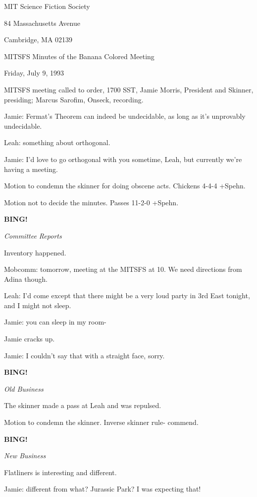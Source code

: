 \documentclass[12pt]{article}
\newcommand{\bing}{{\bf BING!} }
\newcommand{\goto}[1]{\bing \vskip 12pt \centerline{{\em{#1}}}}
\begin{document}
\begin{center}

MIT Science Fiction Society 

84 Massachusetts Avenue

Cambridge, MA 02139

\vspace{12pt}

MITSFS Minutes of the Banana Colored Meeting 

Friday, July 9, 1993

\end{center}
 
\vspace{18pt}

\setlength{\parskip}{6pt}

\noindent
MITSFS meeting called to order, 1700 SST,
Jamie Morris, President and Skinner, presiding; Marcus Sarofim, Onseck, recording.

Jamie: Fermat's Theorem can indeed be undecidable, as long as it's unprovably undecidable.

Leah: something about orthogonal.

Jamie: I'd love to go orthogonal with you sometime, Leah, but currently we're having a meeting.

Motion to condemn the skinner for doing obscene acts. Chickens 4-4-4 +Spehn.

Motion not to decide the minutes. Passes 11-2-0 +Spehn.

\goto{Committee Reports}

Inventory happened.

Mobcomm: tomorrow, meeting at the MITSFS at 10. We need directions from Adina though.

Leah: I'd come except that there might be a very loud party in 3rd East tonight, and I might not sleep.

Jamie: you can sleep in my room-

Jamie cracks up.

Jamie: I couldn't say that with a straight face, sorry.

\goto{Old Business}

The skinner made a pass at Leah and was repulsed.

Motion to condemn the skinner. Inverse skinner rule- commend.

\goto{New Business}

Flatliners is interesting and different.

Jamie: different from what? Jurassic Park? I was expecting that!
\end{document}
